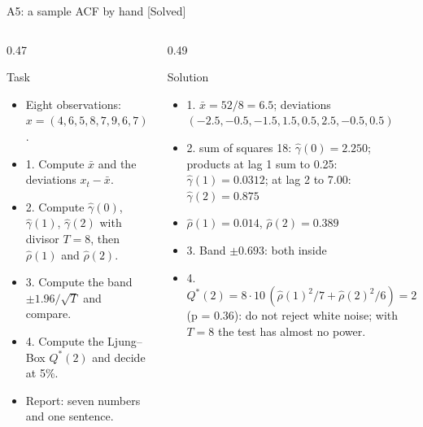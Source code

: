 \begin{frame}{A5: a sample ACF by hand [Solved]}
\itemsize{\scriptsize}
\begin{columns}[T]
\begin{column}{0.47\textwidth}
\begin{block}{Task}
\begin{itemize}
    \item Eight observations: $x = (4, 6, 5, 8, 7, 9, 6, 7)$.
    \item 1. Compute $\bar x$ and the deviations $x_t - \bar x$.
    \item 2. Compute $\hat\gamma(0)$, $\hat\gamma(1)$, $\hat\gamma(2)$ with divisor $T = 8$, then $\hat\rho(1)$ and $\hat\rho(2)$.
    \item 3. Compute the band $\pm 1.96/\sqrt{T}$ and compare.
    \item 4. Compute the Ljung--Box $Q^*(2)$ and decide at 5\%.
    \item Report: seven numbers and one sentence.
\end{itemize}
\end{block}
\end{column}
\begin{column}{0.49\textwidth}
\begin{exampleblock}{Solution}
\begin{itemize}
    \item 1. $\bar x = 52/8 = 6.5$; deviations $(-2.5, -0.5, -1.5, 1.5, 0.5, 2.5, -0.5, 0.5)$
    \item 2. sum of squares 18: $\hat\gamma(0) = 2.250$; products at lag 1 sum to 0.25: $\hat\gamma(1) = 0.0312$; at lag 2 to 7.00: $\hat\gamma(2) = 0.875$
    \item $\hat\rho(1) = 0.014$, $\hat\rho(2) = 0.389$
    \item 3. Band $\pm 0.693$: both inside
    \item 4. $Q^*(2) = 8 \cdot 10\,(\hat\rho(1)^2/7 + \hat\rho(2)^2/6) = 2.02 < 5.99$ (p = 0.36): do not reject white noise; with $T = 8$ the test has almost no power.
\end{itemize}
\end{exampleblock}
\end{column}
\end{columns}
\end{frame}

